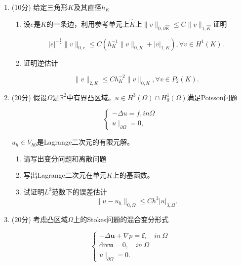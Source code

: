 \documentclass[12pt,a4paper]{article}
\begin{document}
\begin{enumerate}
\begin{enumerate}
			\item 给定三角形$K$及其直径$h_K$,假设$u \in H^4(K)$,写出插值算子的定义，并且给出$\|u-\Pi_K u\|_{0,K}$和$\|u-\Pi_K u\|_{1,K}$的插值误差估计结果(不用证明)。
		\end{enumerate}
		
		

		\item (10分) 给定三角形$K$及其直径$h_K$
		\begin{enumerate}
			\item 设$e$是$K$的一条边，利用参考单元上$\widehat{K}$上$\|v\|_{0,\partial \widehat{K}} \leq C\|v\|_{1,\widehat{K}}$证明
			
			$$|e|^{-\frac{1}{2}} \|v\|_{0,e} \leq C\left(h_K^{-1}\|v\|_{0,K}+|v|_{1,K}\right), \forall v \in H^1(K).$$
			
			\item 证明逆估计
			
			$$\|v\|_{2,K} \leq Ch_K^{-2}\|v\|_{0,K}, \forall v \in P_2(K).$$
		\end{enumerate}
		
		\item (20分) 假设$\Omega$是$\mathbb{R}^2$中有界凸区域。$u \in H^3(\Omega) \cap H_0^1(\Omega)$满足Poisson问题
		
		$$\begin{cases}
			- \Delta u = f, in \Omega \\
			u\mid_{\partial \Omega} = 0, 
		\end{cases}$$ 
		
		$u_h \in V_{h0}$是Lagrange二次元的有限元解。
			
		\begin{enumerate}
			\item 请写出变分问题和离散问题
			\item 写出Lagrange二次元在单元$K$上的基函数。
			\item 试证明$L^2$范数下的误差估计
			$$\|u-u_h\|_{0,\Omega} \leq Ch^3|u|_{3,\Omega}.$$
		\end{enumerate}	
		
		\item (20分) 考虑凸区域$\Omega$上的Stokes问题的混合变分形式
		
		$$\begin{cases}
			- \Delta \boldsymbol{u}+\nabla p = \boldsymbol{f},\quad in \ \Omega \\
			\mathrm{div} \boldsymbol{u} = 0,\quad in \ \Omega \\
			u\mid_{\partial \Omega} = 0.
		\end{cases}$$
		

\end{enumerate}
\end{document}
